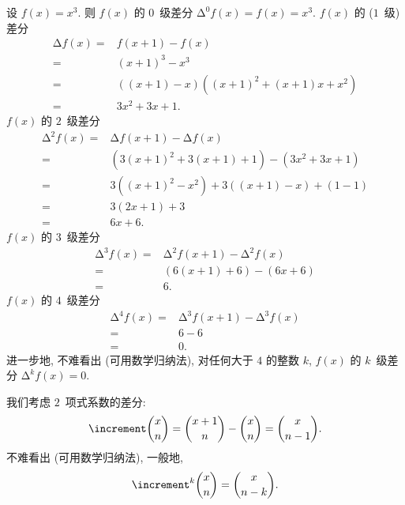 \documentclass[../libro.tex]{subfiles}
\begin{document}
\begin{example}
    设 \(f(x) = x^3\).
    则 \(f(x)\) 的 \(0\)~级差分
    \(\increment^0 f (x) = f(x) = x^3\).
    \(f(x)\) 的 (\(1\)~级) 差分
    \begin{align*}
        \increment f (x)
        = {} &
        f(x + 1) - f(x)
        \\
        = {} &
        (x + 1)^3 - x^3
        \\
        = {} &
        ((x + 1) - x) ((x + 1)^2 + (x + 1) x + x^2)
        \\
        = {} &
        3x^2 + 3x + 1.
    \end{align*}
    \(f(x)\) 的 \(2\)~级差分
    \begin{align*}
        \increment^2 f (x)
        = {} &
        \increment f (x + 1) - \increment f (x)
        \\
        = {} &
        (3 (x + 1)^2 + 3 (x + 1) + 1) - (3 x^2 + 3 x + 1)
        \\
        = {} &
        3 ((x + 1)^2 - x^2) + 3 ((x + 1) - x) + (1 - 1)
        \\
        = {} &
        3 (2 x + 1) + 3
        \\
        = {} &
        6x + 6.
    \end{align*}
    \(f(x)\) 的 \(3\)~级差分
    \begin{align*}
        \increment^3 f (x)
        = {} &
        \increment^2 f (x + 1) - \increment^2 f (x)
        \\
        = {} &
        (6 (x + 1) + 6) - (6 x + 6)
        \\
        = {} &
        6.
    \end{align*}
    \(f(x)\) 的 \(4\)~级差分
    \begin{align*}
        \increment^4 f (x)
        = {} &
        \increment^3 f (x + 1) - \increment^3 f (x)
        \\
        = {} &
        6 - 6
        \\
        = {} &
        0.
    \end{align*}
    进一步地, 不难看出 (可用数学归纳法),
    对任何大于 \(4\) 的整数 \(k\),
    \(f(x)\) 的 \(k\)~级差分 \(\increment^k f (x) = 0\).
\end{example}

\begin{example}
    我们考虑 \(2\)~项式系数的差分:
    \begin{align*}
        \increment \dbinom{x}{n}
        = \dbinom{x+1}{n} - \dbinom{x}{n}
        = \dbinom{x}{n-1}.
    \end{align*}
    不难看出 (可用数学归纳法), 一般地,
    \begin{equation*}
        \increment^k \dbinom{x}{n} = \dbinom{x}{n-k}.
        \qefhere
    \end{equation*}
\end{example}
\end{document}
